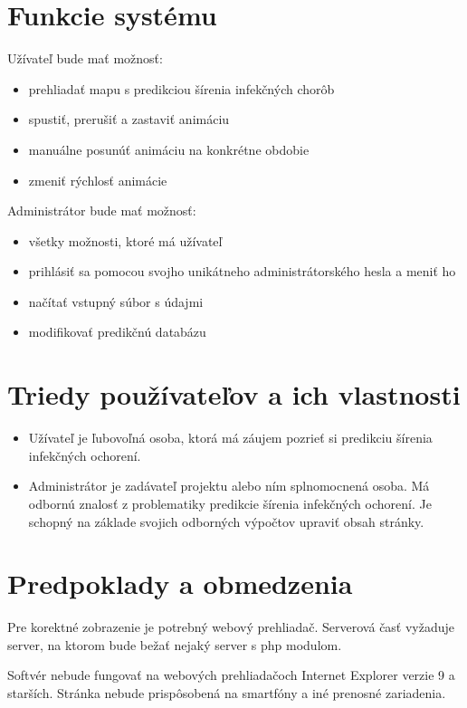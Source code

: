 \documentclass[12pt,a4paper]{report}
\begin{document}
\section[Funkcie systému]{\rmfamily\bfseries
	Funkcie systému}
Užívateľ bude mať možnosť:
\begin{itemize}
	\item prehliadať mapu s predikciou šírenia infekčných chorôb	
	\item spustiť, prerušiť a zastaviť animáciu
	\item manuálne posunúť animáciu na konkrétne obdobie
	\item zmeniť rýchlosť animácie
\end{itemize}
Administrátor bude mať možnosť:
\begin{itemize}
	\item všetky možnosti, ktoré má užívateľ 
	\item prihlásiť sa pomocou svojho unikátneho administrátorského hesla a meniť ho
	\item načítať vstupný súbor s údajmi
	\item modifikovať predikčnú databázu
\end{itemize}

\section[Triedy používateľov a ich vlastnosti]{\rmfamily\bfseries
	Triedy používateľov a ich vlastnosti}
\begin{itemize}
	\item Užívateľ je ľubovoľná osoba, ktorá má záujem pozrieť si predikciu šírenia infekčných ochorení.
	\item Administrátor je zadávateľ projektu alebo ním splnomocnená osoba. Má odbornú znalosť z problematiky predikcie šírenia infekčných ochorení. Je schopný
na základe svojich odborných výpočtov upraviť obsah stránky.
\end{itemize}

\section[Predpoklady a obmedzenia]{\rmfamily\bfseries
	Predpoklady a obmedzenia}
	Pre korektné zobrazenie je potrebný webový prehliadač. Serverová časť vyžaduje server, na ktorom bude bežať nejaký server s php modulom.\par
	Softvér nebude fungovať na webových prehliadačoch Internet Explorer verzie 9 a starších. Stránka nebude prispôsobená na smartfóny a iné prenosné zariadenia. 
\end{document}
